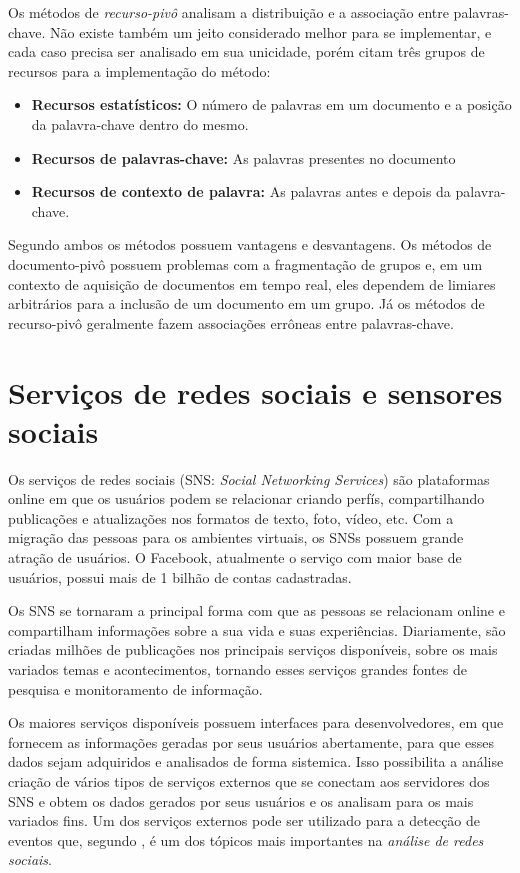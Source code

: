 Os métodos de \textit{recurso-pivô}	analisam a distribuição e a associação entre palavras-chave. Não existe também um jeito considerado melhor para se implementar, e cada caso precisa ser analisado em sua unicidade, porém  citam três grupos de recursos para a implementação do método:

\begin{itemize}
	\item \textbf{Recursos estatísticos:} O número de palavras em um documento e a posição da palavra-chave dentro do mesmo.
	\item \textbf{Recursos de palavras-chave:} As palavras presentes no documento
	\item \textbf{Recursos de contexto de palavra:} As palavras antes e depois da palavra-chave.
\end{itemize}

Segundo  ambos os métodos possuem vantagens e desvantagens. Os métodos de documento-pivô possuem problemas com a fragmentação de grupos e, em um contexto de aquisição de documentos em tempo real, eles dependem de limiares arbitrários para a inclusão de um documento em um grupo. Já os métodos de recurso-pivô geralmente fazem associações errôneas entre palavras-chave.

\section{Serviços de redes sociais e sensores sociais}

Os serviços de redes sociais (SNS: \textit{Social Networking Services}) são plataformas online em que os usuários podem se relacionar criando perfís, compartilhando publicações e atualizações nos formatos de texto, foto, vídeo, etc. Com a migração das pessoas para os ambientes virtuais, os SNSs possuem grande atração de usuários. O Facebook, atualmente o serviço com maior base de usuários, possui mais de 1 bilhão de contas cadastradas.

Os SNS se tornaram a principal forma com que as pessoas se relacionam online e compartilham informações sobre a sua vida e suas experiências. Diariamente, são criadas milhões de publicações nos principais serviços disponíveis, sobre os mais variados temas e acontecimentos, tornando esses serviços grandes fontes de pesquisa e monitoramento de informação.

Os maiores serviços disponíveis possuem interfaces para desenvolvedores, em que fornecem as informações geradas por seus usuários abertamente, para que esses dados sejam adquiridos e analisados de forma sistemica. Isso possibilita a análise  criação de vários tipos de serviços externos que se conectam aos servidores dos SNS e obtem os dados gerados por seus usuários e os analisam para os mais variados fins. Um dos serviços externos pode ser utilizado para a detecção de eventos que, segundo , é um dos tópicos mais importantes na \textit{análise de redes sociais}.

